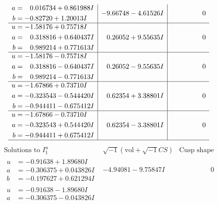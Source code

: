 \documentclass[1p]{elsarticle_modified}
\theoremstyle{definition}
\newcommand{\I}{\sqrt{-1}}
\begin{document}
$$\begin{array}{c|c|c}
\begin{aligned}
a &= \phantom{-}0.016734 + 0.861988 I \\
b &= -0.82720 + 1.20013 I\end{aligned}
 & -9.66748 - 4.61526 I & \phantom{-0.000000 } 0 \\ \hline\begin{aligned}
u &= -1.58176 + 0.75718 I \\
a &= \phantom{-}0.318816 + 0.640437 I \\
b &= \phantom{-}0.989214 + 0.771613 I\end{aligned}
 & \phantom{-}0.26052 + 9.55635 I & \phantom{-0.000000 } 0 \\ \hline\begin{aligned}
u &= -1.58176 - 0.75718 I \\
a &= \phantom{-}0.318816 - 0.640437 I \\
b &= \phantom{-}0.989214 - 0.771613 I\end{aligned}
 & \phantom{-}0.26052 - 9.55635 I & \phantom{-0.000000 } 0 \\ \hline\begin{aligned}
u &= -1.67866 + 0.73710 I \\
a &= -0.323543 - 0.544420 I \\
b &= -0.944411 - 0.675412 I\end{aligned}
 & \phantom{-}0.62354 + 3.38801 I & \phantom{-0.000000 } 0 \\ \hline\begin{aligned}
u &= -1.67866 - 0.73710 I \\
a &= -0.323543 + 0.544420 I \\
b &= -0.944411 + 0.675412 I\end{aligned}
 & \phantom{-}0.62354 - 3.38801 I & \phantom{-0.000000 } 0\\
 \hline 
 \end{array}$$\newpage$$\begin{array}{c|c|c}  
\text{Solutions to }I^u_{1}& \I (\text{vol} + \sqrt{-1}CS) & \text{Cusp shape}\\
 \hline 
\begin{aligned}
u &= -0.91638 + 1.89680 I \\
a &= -0.306375 + 0.043826 I \\
b &= -0.197627 + 0.621294 I\end{aligned}
 & -4.94081 - 9.75847 I & \phantom{-0.000000 } 0 \\ \hline\begin{aligned}
u &= -0.91638 - 1.89680 I \\
a &= -0.306375 - 0.043826 I \\

\end{aligned}
\end{array}$$
\end{document}
